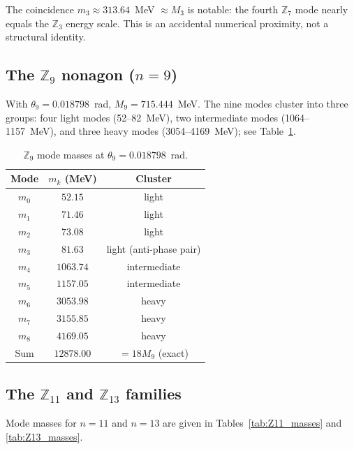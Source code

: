 \documentclass[11pt]{article}
\begin{document}
The coincidence $m_3 \approx 313.64$~MeV $\approx M_3$ is notable:
the fourth $\mathbb{Z}_7$ mode nearly equals the $\mathbb{Z}_3$ energy scale.
This is an accidental numerical proximity, not a structural identity.

\subsection{The $\mathbb{Z}_9$ nonagon ($n = 9$)}

With $\theta_9 = 0.018798$~rad, $M_9 = 715.444$~MeV.
The nine modes cluster into three groups: four light modes
(52--82~MeV), two intermediate modes (1064--1157~MeV), and three
heavy modes (3054--4169~MeV); see Table~\ref{tab:Z9_masses}.

\begin{table}[ht]
  \caption{$\mathbb{Z}_9$ mode masses at $\theta_9 = 0.018798$~rad.}
  \label{tab:Z9_masses}
  \begin{tabular}{ccc}
    \toprule
    Mode & $m_k$ (MeV) & Cluster \\
    \midrule
    $m_0$ & $52.15$ & light \\
    $m_1$ & $71.46$ & light \\
    $m_2$ & $73.08$ & light \\
    $m_3$ & $81.63$ & light (anti-phase pair) \\
    $m_4$ & $1063.74$ & intermediate \\
    $m_5$ & $1157.05$ & intermediate \\
    $m_6$ & $3053.98$ & heavy \\
    $m_7$ & $3155.85$ & heavy \\
    $m_8$ & $4169.05$ & heavy \\
    \midrule
    Sum   & $12878.00$ & $= 18 M_9$ (exact) \\
    \bottomrule
  \end{tabular}
\end{table}

\subsection{The $\mathbb{Z}_{11}$ and $\mathbb{Z}_{13}$ families}

Mode masses for $n = 11$ and $n = 13$ are given in Tables~\ref{tab:Z11_masses}
and \ref{tab:Z13_masses}.
\end{document}
